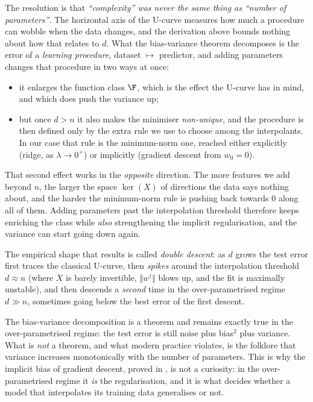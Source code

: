 The resolution is that \emph{``complexity'' was never the same thing as ``number of
parameters''}. The horizontal axis of the U-curve measures how much a procedure
can wobble when the data changes, and the derivation above bounds nothing about how
that relates to $d$. What the bias-variance theorem decomposes is the error of a
\emph{learning procedure}, dataset $\mapsto$ predictor, and adding parameters changes
that procedure in two ways at once:
\begin{itemize}
    \item it enlarges the function class $\F$, which is the effect the U-curve has in
    mind, and which does push the variance up;
    \item but once $d > n$ it also makes the minimiser \emph{non-unique}, and the
    procedure is then defined only by the extra rule we use to choose among the
    interpolants. In our case that rule is the minimum-norm one, reached either
    explicitly (ridge, as $\lambda \to 0^+$) or implicitly (gradient descent from
    $w_0 = 0$).
\end{itemize}
That second effect works in the \emph{opposite} direction. The more features we add
beyond $n$, the larger the space $\ker(X)$ of directions the data says nothing about,
and the harder the minimum-norm rule is pushing back towards $0$ along all of them.
Adding parameters past the interpolation threshold therefore keeps enriching the
class while \emph{also} strengthening the implicit regularisation, and the variance
can start going down again.

The empirical shape that results is called \emph{double descent}: as $d$ grows the
test error first traces the classical U-curve, then \emph{spikes} around the
interpolation threshold $d \approx n$ (where $X$ is barely invertible, $\Vert
w^\dagger \Vert$ blows up, and the fit is maximally unstable), and then descends a
\emph{second} time in the over-parametrised regime $d \gg n$, sometimes going below
the best error of the first descent.

\begin{remark}
The bias-variance decomposition is a theorem and remains exactly true in the
over-parametrised regime: the test error is still noise plus bias$^2$ plus variance.
What is \emph{not} a theorem, and what modern practice violates, is the folklore that
variance increases monotonically with the number of parameters. This is why the
implicit bias of gradient descent, proved in , is not a curiosity: in
the over-parametrised regime it \emph{is} the regularisation, and it is what decides
whether a model that interpolates its training data generalises or not.
\end{remark}


